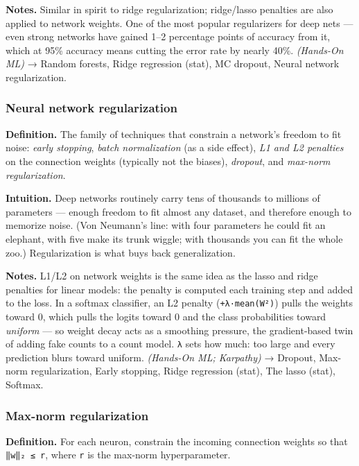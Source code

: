 \documentclass[
  10pt,
  letterpaper,
  onecolumn]{article}
\begin{document}
\textbf{Notes.} Similar in spirit to ridge regularization; ridge/lasso
penalties are also applied to network weights. One of the most popular
regularizers for deep nets --- even strong networks have gained 1--2
percentage points of accuracy from it, which at 95\% accuracy means
cutting the error rate by nearly 40\%. \emph{(Hands-On ML)} → Random
forests, Ridge regression (stat), MC dropout, Neural network
regularization.

\hypertarget{neural-network-regularization}{%
\subsubsection{Neural network
regularization}\label{neural-network-regularization}}

\textbf{Definition.} The family of techniques that constrain a network's
freedom to fit noise: \emph{early stopping}, \emph{batch normalization}
(as a side effect), \emph{L1 and L2 penalties} on the connection weights
(typically not the biases), \emph{dropout}, and \emph{max-norm
regularization}.

\textbf{Intuition.} Deep networks routinely carry tens of thousands to
millions of parameters --- enough freedom to fit almost any dataset, and
therefore enough to memorize noise. (Von Neumann's line: with four
parameters he could fit an elephant, with five make its trunk wiggle;
with thousands you can fit the whole zoo.) Regularization is what buys
back generalization.

\textbf{Notes.} L1/L2 on network weights is the same idea as the lasso
and ridge penalties for linear models: the penalty is computed each
training step and added to the loss. In a softmax classifier, an L2
penalty (\texttt{+λ·mean(W²)}) pulls the weights toward 0, which pulls
the logits toward 0 and the class probabilities toward \emph{uniform}
--- so weight decay acts as a smoothing pressure, the gradient-based
twin of adding fake counts to a count model. \texttt{λ} sets how much:
too large and every prediction blurs toward uniform. \emph{(Hands-On ML;
Karpathy)} → Dropout, Max-norm regularization, Early stopping, Ridge
regression (stat), The lasso (stat), Softmax.

\hypertarget{max-norm-regularization}{%
\subsubsection{Max-norm regularization}\label{max-norm-regularization}}

\textbf{Definition.} For each neuron, constrain the incoming connection
weights so that \texttt{‖w‖₂\ ≤\ r}, where \texttt{r} is the max-norm
hyperparameter.
\end{document}
